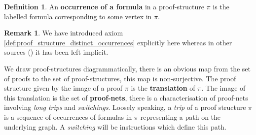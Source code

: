 \documentclass[12pt]{article}
\theoremstyle{plain}
\theoremstyle{definition}
\newtheorem{defn}[thm]{Definition} %
\newtheorem{remark}[thm]{Remark}
\begin{document}
\begin{defn}\label{def:occurrences_labels}
An \textbf{occurrence of a formula} in a proof-structure $\pi$ is the labelled formula corresponding to some vertex in $\pi$.
\end{defn}
\begin{remark}
We have introduced axiom \ref{def:proof_structure_distinct_occurrences} explicitly here whereas in other sources (\cite{linearlogic}) it has been left implicit.
\end{remark}
We draw proof-structures diagrammatically, there is an obvious map from the set of proofs to the set of proof-structures, this map is non-surjective. The proof structure given by the image of a proof $\pi$ is the \textbf{translation} of $\pi$. The image of this translation is the set of \textbf{proof-nets}, there is a characterisation of proof-nets involving \emph{long trips} and \emph{switchings}. Loosely speaking, a \emph{trip} of a proof structure $\pi$ is a sequence of occurrences of formulas in $\pi$ representing a path on the underlying graph. A \emph{switching} will be instructions which define this path.
\end{document}
